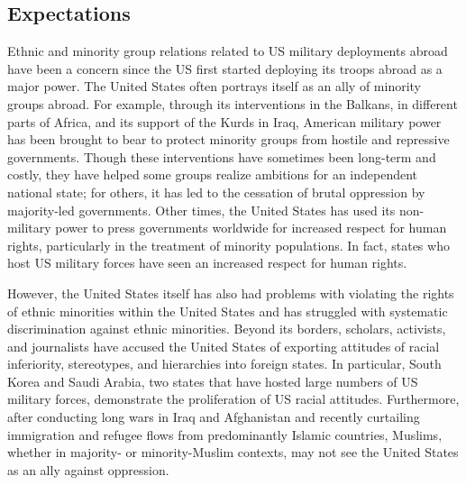 

\subsection*{Expectations}

Ethnic and minority group relations related to US military deployments abroad have been a concern since the US first started deploying its troops abroad as a major power. The United States often portrays itself as an ally of minority groups abroad. For example, through its interventions in the Balkans, in different parts of Africa, and its support of the Kurds in Iraq, American military power has been brought to bear to protect minority groups from hostile and repressive governments. Though these interventions have sometimes been long-term and costly, they have helped some groups realize ambitions for an independent national state; for others, it has led to the cessation of brutal oppression by majority-led governments. Other times, the United States has used its non-military power to press governments worldwide for increased respect for human rights, particularly in the treatment of minority populations. In fact, states who host US military forces have seen an increased respect for human rights.\cite{bell2017}

However, the United States itself has also had problems with violating the rights of ethnic minorities within the United States and has struggled with systematic discrimination against ethnic minorities.\cite{Williamson2018} Beyond its borders, scholars, activists, and journalists have accused the United States of exporting attitudes of racial inferiority, stereotypes, and hierarchies into foreign states. In particular, South Korea and Saudi Arabia, two states that have hosted large numbers of US military forces, demonstrate the proliferation of US racial attitudes.\cite{Moon1997,Vitalis2007} Furthermore, after conducting long wars in Iraq and Afghanistan and recently curtailing immigration and refugee flows from predominantly Islamic countries, Muslims, whether in majority- or minority-Muslim contexts, may not see the United States as an ally against oppression. 

